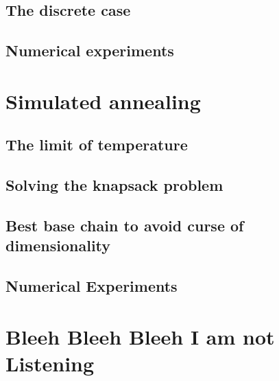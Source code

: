 \documentclass[]{article}
\theoremstyle{definition}
\begin{document}
    \subsection{The discrete case}
    \subsection{Numerical experiments}

\section{Simulated annealing}
    \subsection{The limit of temperature}

\subsection{Solving the knapsack problem}
    \subsection{Best base chain to avoid curse of dimensionality}
    \subsection{Numerical Experiments}

\appendix
\section{Bleeh Bleeh Bleeh I am not Listening}



\end{document}
